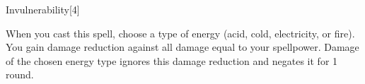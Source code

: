 \begin{spellsection}{Invulnerability}[4]
    \begin{spellheader}
    \end{spellheader}
    \begin{spellcontent}
        \begin{spelltargetinginfo}
        \end{spelltargetinginfo}
        \begin{spelleffects}
            \spellspecial When you cast this spell, choose a type of energy (acid, cold, electricity, or fire).
            \spelleffect You gain damage reduction against all damage equal to your spellpower.
            Damage of the chosen energy type ignores this damage reduction and negates it for 1 round.
            \spelldur \durlong
        \end{spelleffects}
    \end{spellcontent}
    \begin{spellfooter}
        \miscastexplode
    \end{spellfooter}
    \begin{spellaugments}
    \end{spellaugments}
\end{spellsection}

